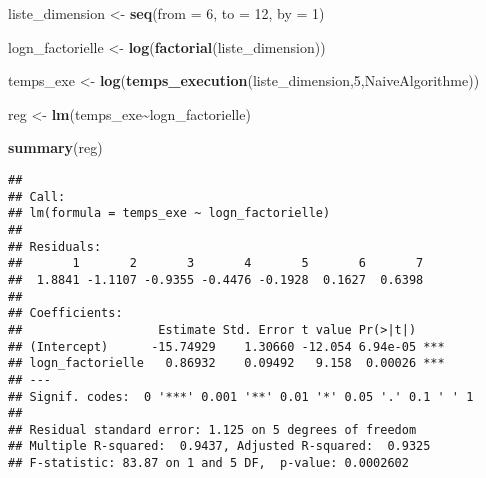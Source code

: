 \documentclass[
]{article}
\newenvironment{Shaded}{\begin{snugshade}}{\end{snugshade}}
\newcommand{\AttributeTok}[1]{\textcolor[rgb]{0.13,0.29,0.53}{#1}}
\newcommand{\DecValTok}[1]{\textcolor[rgb]{0.00,0.00,0.81}{#1}}
\newcommand{\FunctionTok}[1]{\textcolor[rgb]{0.13,0.29,0.53}{\textbf{#1}}}
\newcommand{\NormalTok}[1]{#1}
\newcommand{\OtherTok}[1]{\textcolor[rgb]{0.56,0.35,0.01}{#1}}
\newcommand{\SpecialCharTok}[1]{\textcolor[rgb]{0.81,0.36,0.00}{\textbf{#1}}}
\begin{document}
\begin{Shaded}
\begin{Highlighting}[]
\NormalTok{liste\_dimension }\OtherTok{\textless{}{-}} \FunctionTok{seq}\NormalTok{(}\AttributeTok{from =} \DecValTok{6}\NormalTok{, }\AttributeTok{to =} \DecValTok{12}\NormalTok{, }\AttributeTok{by =} \DecValTok{1}\NormalTok{)}

\NormalTok{logn\_factorielle }\OtherTok{\textless{}{-}} \FunctionTok{log}\NormalTok{(}\FunctionTok{factorial}\NormalTok{(liste\_dimension))}

\NormalTok{temps\_exe }\OtherTok{\textless{}{-}} \FunctionTok{log}\NormalTok{(}\FunctionTok{temps\_execution}\NormalTok{(liste\_dimension,}\DecValTok{5}\NormalTok{,NaiveAlgorithme)) }

\NormalTok{reg }\OtherTok{\textless{}{-}} \FunctionTok{lm}\NormalTok{(temps\_exe}\SpecialCharTok{\textasciitilde{}}\NormalTok{logn\_factorielle)}

\FunctionTok{summary}\NormalTok{(reg)}
\end{Highlighting}
\end{Shaded}

\begin{verbatim}
## 
## Call:
## lm(formula = temps_exe ~ logn_factorielle)
## 
## Residuals:
##       1       2       3       4       5       6       7 
##  1.8841 -1.1107 -0.9355 -0.4476 -0.1928  0.1627  0.6398 
## 
## Coefficients:
##                   Estimate Std. Error t value Pr(>|t|)    
## (Intercept)      -15.74929    1.30660 -12.054 6.94e-05 ***
## logn_factorielle   0.86932    0.09492   9.158  0.00026 ***
## ---
## Signif. codes:  0 '***' 0.001 '**' 0.01 '*' 0.05 '.' 0.1 ' ' 1
## 
## Residual standard error: 1.125 on 5 degrees of freedom
## Multiple R-squared:  0.9437, Adjusted R-squared:  0.9325 
## F-statistic: 83.87 on 1 and 5 DF,  p-value: 0.0002602
\end{verbatim}
\end{document}
